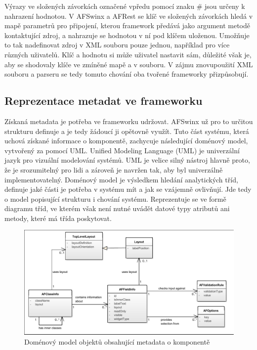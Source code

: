 Výrazy ve složených závorkách označené vpředu pomocí znaku \# jsou určeny k nahrazení hodnotou. V AFSwinx a AFRest \cite{tomasek-thesis} se klíč ve složených závorkách hledá v mapě parametrů pro připojení, kterou framework předává jako argument metodě kontaktující zdroj, a nahrazuje se hodnotou v ní pod klíčem uloženou. Umožňuje to tak nadefinovat zdroj v XML souboru pouze jednou, například pro více různých uživatelů. Klíč a hodnotu si může uživatel nastavit sám, důležité však je, aby se shodovaly klíče ve zmíněné mapě a v souboru. V zájmu znovupoužití XML souboru a parseru se tedy tomuto chování oba tvořené frameworky přizpůsobují.

\subsection{Reprezentace metadat ve frameworku}
Získaná metadata je potřeba ve frameworku udržovat. AFSwinx už pro to určitou strukturu definuje \cite{tomasek-thesis} a je tedy žádoucí ji opětovně využít. Tuto část systému, která uchová získané informace o komponentě, zachycuje následující doménový model, vytvořený za pomocí UML. Unified Modeling Language (UML) \cite{UmlArlow} je univerzální jazyk pro vizuální modelování systémů. UML je velice silný nástroj hlavně proto, že je srozumitelný pro lidi a zároveň je navržen tak, aby byl univerzálně implementovatelný. Doménový model je výsledkem hledání analytických tříd, definuje jaké části je potřeba v systému mít a jak se vzájemně ovlivňují. Jde tedy o model popisující strukturu i chování systému. Reprezentuje se ve formě diagramu tříd, ve kterém však není nutné uvádět datové typy atributů ani metody, které má třída poskytovat.

\begin{figure}[h!]
\includegraphics[width=\textwidth, trim=1 1 1 1, clip]{figures/domainModel}
\caption{Doménový model objektů obsahující metadata o komponentě}
\label{img:metadataModel}
\end{figure}

